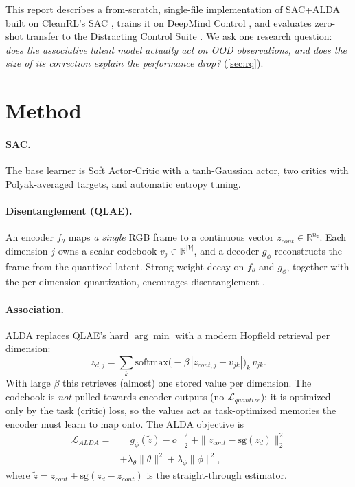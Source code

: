 \documentclass{article}
\theoremstyle{plain}
\theoremstyle{definition}
\theoremstyle{remark}
\begin{document}
This report describes a from-scratch, single-file implementation of SAC+ALDA
built on CleanRL's SAC \citep{huang2022cleanrl}, trains it on DeepMind Control
\citep{tassa2018dmc}, and evaluates zero-shot transfer to the Distracting
Control Suite \citep{stone2021dcs}. We ask one research question: \emph{does the
associative latent model actually act on OOD observations, and does the size of
its correction explain the performance drop?} (\cref{sec:rq}).

\section{Method}
\label{sec:method}

\paragraph{SAC.} The base learner is Soft Actor-Critic
\citep{haarnoja2018sac} with a tanh-Gaussian actor, two critics with
Polyak-averaged targets, and automatic entropy tuning.

\paragraph{Disentanglement (QLAE).} An encoder $f_\theta$ maps \emph{a single}
RGB frame to a continuous vector $z_{cont}\in\mathbb{R}^{n_z}$. Each dimension
$j$ owns a scalar codebook $v_j\in\mathbb{R}^{|V|}$, and a decoder $g_\phi$
reconstructs the frame from the quantized latent. Strong weight decay on
$f_\theta$ and $g_\phi$, together with the per-dimension quantization,
encourages disentanglement \citep{hsu2023qlae}.

\paragraph{Association.} ALDA replaces QLAE's hard $\arg\min$ with a modern
Hopfield retrieval \citep{ramsauer2020hopfield} per dimension:
\begin{equation}
  z_{d,j} = \textstyle\sum_k \mathrm{softmax}\big(-\beta\,|z_{cont,j}-v_{jk}|\big)_k\, v_{jk}.
  \label{eq:assoc}
\end{equation}
With large $\beta$ this retrieves (almost) one stored value per dimension. The
codebook is \emph{not} pulled towards encoder outputs (no $\mathcal{L}_{quantize}$);
it is optimized only by the task (critic) loss, so the values act as
task-optimized memories the encoder must learn to map onto. The ALDA objective is
\begin{equation}
  \begin{aligned}
  \mathcal{L}_{ALDA} = {} & \|g_\phi(\tilde z) - o\|_2^2 + \|z_{cont} - \mathrm{sg}(z_d)\|_2^2 \\
  & + \lambda_\theta\|\theta\|^2 + \lambda_\phi\|\phi\|^2,
  \end{aligned}
\end{equation}
where $\tilde z = z_{cont} + \mathrm{sg}(z_d - z_{cont})$ is the
straight-through estimator.
\end{document}
